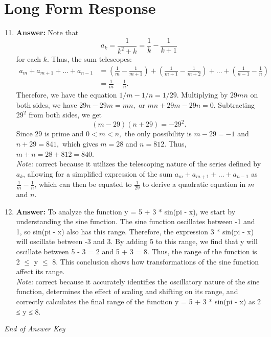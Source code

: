 \documentclass[12pt]{article}
\begin{document}
\section*{Long Form Response}
\begin{enumerate}[label=\arabic*.]
\setcounter{enumi}{10}
\item \textbf{Answer:} Note that \[a_k = \frac{1}{k^2+k} = \frac{1}{k} - \frac{1}{k+1}\]for each $k.$ Thus, the sum telescopes: \[\begin{aligned} a_m + a_{m+1} + \dots + a_{n-1} & = \left(\frac{1}{m} - \frac{1}{m+1}\right) + \left(\frac{1}{m+1} - \frac{1}{m+2}\right) + \dots + \left(\frac{1}{n-1} - \frac{1}{n}\right) \\ &= \frac{1}{m} - \frac{1}{n}. \end{aligned}\]Therefore, we have the equation $1/m - 1/n = 1/29.$ Multiplying by $29 mn$ on both sides, we have $29 n - 29 m = mn,$ or $mn + 29 m - 29 n = 0.$ Subtracting $29^2$ from both sides, we get \[(m-29)(n+29) = -29^2.\]Since $29$ is prime and $0 < m < n,$ the only possibility is $m-29 = -1$ and $n+29 = 841,$ which gives $m = 28$ and $n = 812.$ Thus, $m+n=28+812=\boxed{840}.$
\\ \textit{Note:} correct because it utilizes the telescoping nature of the series defined by \( a_k \), allowing for a simplified expression of the sum \( a_m + a_{m+1} + \dots + a_{n-1} \) as \( \frac{1}{m} - \frac{1}{n} \), which can then be equated to \( \frac{1}{29} \) to derive a quadratic equation in \( m \) and \( n \).
\item \textbf{Answer:} To analyze the function y = 5 + 3 * sin(pi - x), we start by understanding the sine function. The sine function oscillates between -1 and 1, so sin(pi - x) also has this range. Therefore, the expression 3 * sin(pi - x) will oscillate between -3 and 3. By adding 5 to this range, we find that y will oscillate between 5 - 3 = 2 and 5 + 3 = 8. Thus, the range of the function is 2 \ensuremath{\leq} y \ensuremath{\leq} 8. This conclusion shows how transformations of the sine function affect its range.
\\ \textit{Note:} correct because it accurately identifies the oscillatory nature of the sine function, determines the effect of scaling and shifting on its range, and correctly calculates the final range of the function y = 5 + 3 * sin(pi - x) as 2 ≤ y ≤ 8.
\end{enumerate}

\vfill
\noindent\textit{End of Answer Key}
\end{document}

